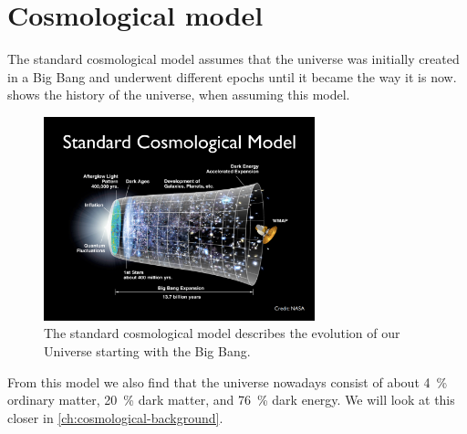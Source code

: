 \section{Cosmological model}
The standard cosmological model assumes that the universe was initially created in a Big Bang and underwent different epochs until it became the way it is now.  shows the history of the universe, when assuming this model. 
\begin{figure}[H]
	\centering
		\includegraphics[width=0.7\textwidth]{img/ch-01/standardcosmologicalmodel.png}
		\caption{The standard cosmological model describes the evolution of our Universe starting with the Big Bang.}
		\label{fig:standardcosmologicalmodel}
\end{figure}
From this model we also find that the universe nowadays consist of about \SI{4}{\percent} ordinary matter, \SI{20}{\percent} dark matter, and \SI{76}{\percent} dark energy. We will look at this closer in \cref{ch:cosmological-background}. 

